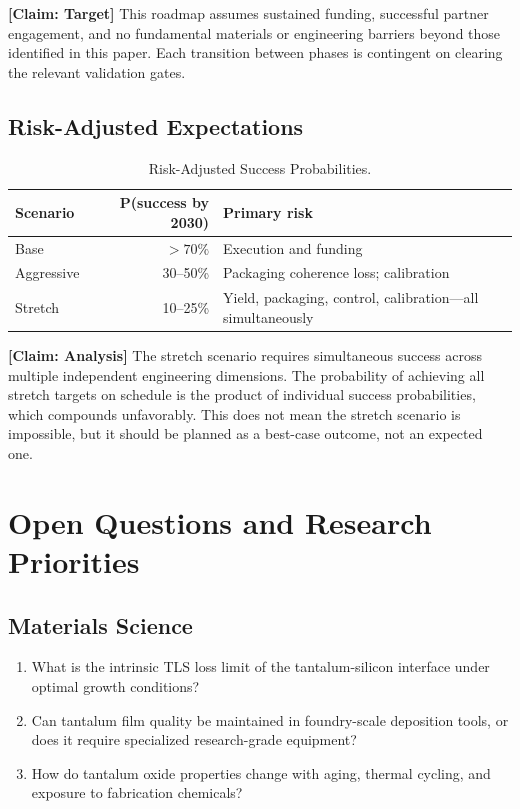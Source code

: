 \documentclass[conference]{IEEEtran}
\begin{document}
\textbf{[Claim: Target]} This roadmap assumes sustained funding, successful partner engagement, and no fundamental materials or engineering barriers beyond those identified in this paper. Each transition between phases is contingent on clearing the relevant validation gates.

\subsection{Risk-Adjusted Expectations}

\begin{table}[htbp]
\centering
\caption{Risk-Adjusted Success Probabilities.}
\label{tab:risk_adjusted}
\begin{tabular}{lrp{3cm}}
\toprule
\textbf{Scenario} & \textbf{P(success by 2030)} & \textbf{Primary risk} \\
\midrule
Base & $> 70\%$ & Execution and funding \\
Aggressive & 30--50\% & Packaging coherence loss; calibration \\
Stretch & 10--25\% & Yield, packaging, control, calibration---all simultaneously \\
\bottomrule
\end{tabular}
\end{table}

\textbf{[Claim: Analysis]} The stretch scenario requires simultaneous success across multiple independent engineering dimensions. The probability of achieving all stretch targets on schedule is the product of individual success probabilities, which compounds unfavorably. This does not mean the stretch scenario is impossible, but it should be planned as a best-case outcome, not an expected one.

\section{Open Questions and Research Priorities}

\subsection{Materials Science}

\begin{enumerate}
\item What is the intrinsic TLS loss limit of the tantalum-silicon interface under optimal growth conditions?
\item Can tantalum film quality be maintained in foundry-scale deposition tools, or does it require specialized research-grade equipment?
\item How do tantalum oxide properties change with aging, thermal cycling, and exposure to fabrication chemicals?
\end{enumerate}
\end{document}
